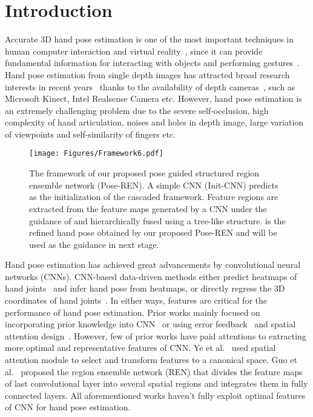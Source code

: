 \documentclass[final, 5p]{elsarticle}
\begin{document}
\section{Introduction}
\label{sec:intro}

Accurate 3D hand pose estimation is one of the most important techniques in human computer interaction and virtual reality~\cite{erol2007vision}, since it can provide fundamental information for interacting with objects and performing gestures~\cite{chen2017motion, de2016skeleton}. Hand pose estimation from single depth images has attracted broad research interests in recent years~\cite{supancic2015depth, tompson2014real, tang2015opening, YeSpatialHandECCV2016, Xu2017, guo2017region, wan2017crossing, ge2017threedcnn} thanks to the availability of depth cameras~\cite{zhang2012microsoft, wang2013depth, shi2015high, keselman2017intel}, such as Microsoft Kinect, Intel Realsense Camera etc. However, hand pose estimation is an extremely challenging problem due to the severe self-occlusion, high complexity of hand articulation, noises and holes in depth image, large variation of viewpoints and self-similarity of fingers etc.

\begin{figure*}[!htb]
  \centering
    \centerline{\texttt{[image: Figures/Framework6.pdf]}}
    \caption{The framework of our proposed pose guided structured region ensemble network (Pose-REN). A simple CNN (Init-CNN) predicts  as the initialization of the cascaded framework. Feature regions are extracted from the feature maps generated by a CNN under the guidance of  and hierarchically fused using a tree-like structure.  is the refined hand pose obtained by our proposed Pose-REN and will be used as the guidance in next stage.}
\label{fig:framework}
\end{figure*}

Hand pose estimation has achieved great advancements by convolutional neural networks (CNNs).
CNN-based data-driven methods either predict heatmaps of hand joints~\cite{tompson2014real, ge2016robust} and infer hand pose from heatmaps, or directly regress the 3D coordinates of hand joints~\cite{oberweger2015hands, oberweger2015training, YeSpatialHandECCV2016, madadi2017end, wan2017crossing, zhou2016model}. In either ways, features are critical for the performance of hand pose estimation. Prior works mainly focused on incorporating prior knowledge into CNN~\cite{oberweger2015hands, zhou2016model} or using error feedback~\cite{oberweger2015training} and spatial attention design~\cite{YeSpatialHandECCV2016}. However, few of prior works have paid attentions to extracting more optimal and representative features of CNN.
Ye et al.~\cite{YeSpatialHandECCV2016} used spatial attention module to select and transform features to a canonical space.
Guo et al.~\cite{guo2017region, wang2018region} proposed the region ensemble network (REN) that divides the feature maps of last convolutional layer into several spatial regions and integrates them in fully connected layers. All aforementioned works haven't fully exploit optimal features of CNN for hand pose estimation.
\end{document}

